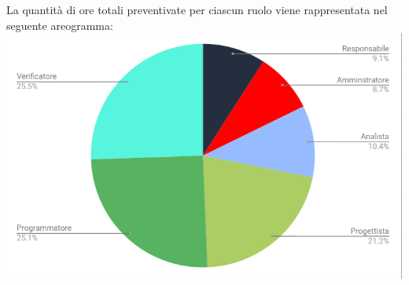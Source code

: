 \vskip 30pt %
La quantità di ore totali preventivate per ciascun ruolo viene rappresentata nel seguente areogramma:\\
\includegraphics[width=1\textwidth]{./src/Preventivo/src/img/TortaProj.png}

